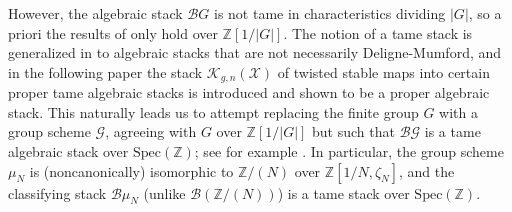 \documentclass[11pt]{amsart}
\theoremstyle{definition}
\begin{document}
However, the algebraic stack ${\mathcal{B}} G$ is not tame in characteristics dividing $|G|$, so a priori the results of \cite{ACV} only hold over $\mathbb{Z}[1/|G|]$. The notion of a tame stack is generalized in \cite{AOV1} to algebraic stacks that are not necessarily Deligne-Mumford, and in the following paper \cite{AOV2} the stack ${\mathcal{K}}_{g,n}({\mathcal{X}})$ of twisted stable maps into certain proper tame algebraic stacks is introduced and shown to be a proper algebraic stack. This naturally leads us to attempt replacing the finite group $G$ with a group scheme ${\mathcal{G}}$, agreeing with $G$ over $\mathbb{Z}[1/|G|]$ but such that ${\mathcal{B}}{\mathcal{G}}$ is a tame algebraic stack over $\mathrm{Spec}(\mathbb{Z})$; see for example \cite{Abr}. In particular, the group scheme $\mu_N$ is (noncanonically) isomorphic to $\mathbb{Z}/(N)$ over $\mathbb{Z}[1/N,\zeta_N]$, and the classifying stack ${\mathcal{B}}\mu_N$ (unlike ${\mathcal{B}}(\mathbb{Z}/(N))$) is a tame stack over $\mathrm{Spec}(\mathbb{Z})$. 
\end{document}
